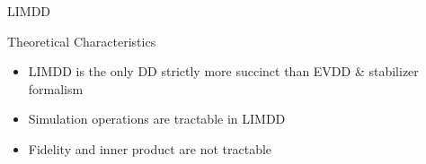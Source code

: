 \begin{refframe}{LIMDD}
	
%

\vspace{-.5em}

\begin{block}{Theoretical Characteristics~\cite{vinkhuijzen2023efficient}}
\vspace{-.5em}
	\begin{itemize}
		\item<+-> LIMDD is the only DD strictly more succinct than EVDD \& stabilizer formalism 
		\item<+-> Simulation operations are tractable in LIMDD
		\item<+-> Fidelity and inner product are not tractable~\cite{vinkhuijzen2024a}
	\end{itemize}
	\vspace{-.5em}
\end{block}

~\\


\begin{columns}
\begin{column}{.45\textwidth}	
\centering
{}
\end{column}
\end{columns}
\end{refframe}
